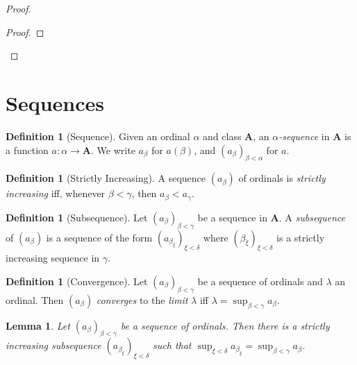 \documentclass{book}
\let\qed\relax
\newtheorem{lm}[ax]{Lemma}
\theoremstyle{definition}
\newtheorem{df}[ax]{Definition}
\begin{document}
\begin{proof}
\begin{proof}
\end{proof}
\qed
\end{proof}

\section{Sequences}

\begin{df}[Sequence]
Given an ordinal $\alpha$ and class $\mathbf{A}$, an \emph{$\alpha$-sequence} in $\mathbf{A}$ is a function $a : \alpha \rightarrow \mathbf{A}$. We write $a_\beta$ for $a(\beta)$, and $(a_\beta)_{\beta < \alpha}$ for $a$.
\end{df}

\begin{df}[Strictly Increasing]
A sequence $(a_\beta)$ of ordinals is \emph{strictly increasing} iff, whenever $\beta < \gamma$, then $a_\beta < a_\gamma$.
\end{df}

\begin{df}[Subsequence]
Let $(a_\beta)_{\beta < \gamma}$ be a sequence in $\mathbf{A}$. A \emph{subsequence} of $(a_\beta)$ is a sequence of the form $(a_{\beta_\xi})_{\xi < \delta}$ where $(\beta_\xi)_{\xi < \delta}$ is a strictly increasing sequence in $\gamma$.
\end{df}

\begin{df}[Convergence]
Let $(a_\beta)_{\beta < \gamma}$ be a sequence of ordinals and $\lambda$ an ordinal. Then $(a_\beta)$ \emph{converges} to the \emph{limit} $\lambda$ iff $\lambda = \sup_{\beta < \gamma} a_\beta$.
\end{df}

\begin{lm}
\label{lm:convergentsubsequence}
Let $(a_\beta)_{\beta < \gamma}$ be a sequence of ordinals. Then there is a strictly increasing subsequence $(a_{\beta_\xi})_{\xi < \delta}$ such that $\sup_{\xi < \delta} a_{\beta_\xi} = \sup_{\beta < \gamma} a_\beta$.
\end{lm}
\end{document}

